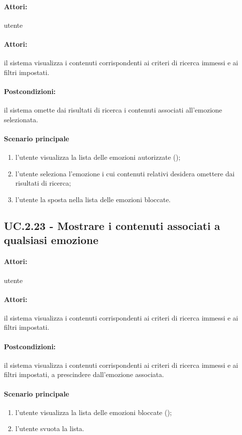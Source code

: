 \documentclass[10pt,a4paper,headinclude,footinclude,hidelinks]{scrreprt} %
\begin{document}
	\paragraph{Attori:} utente
	\paragraph{Attori:} il sistema visualizza i contenuti corrispondenti ai criteri di ricerca immessi e ai filtri impostati.
	\paragraph{Postcondizioni:} il sistema omette dai risultati di ricerca i contenuti associati all'emozione selezionata.
	\paragraph{Scenario principale}
	\begin{enumerate}
	\item l'utente visualizza la lista delle emozioni autorizzate ();
	\item l'utente seleziona l'emozione i cui contenuti relativi desidera omettere dai risultati di ricerca;
	\item l'utente la sposta nella lista delle emozioni bloccate.
	\end{enumerate}

	\subsection[UC.2.23]{UC.2.23 - Mostrare i contenuti associati a qualsiasi emozione}
	\label{sec:stage:ar:uc:2_23}
	\paragraph{Attori:} utente
	\paragraph{Attori:} il sistema visualizza i contenuti corrispondenti ai criteri di ricerca immessi e ai filtri impostati.
	\paragraph{Postcondizioni:} il sistema visualizza i contenuti corrispondenti ai criteri di ricerca immessi e ai filtri impostati, a prescindere dall'emozione associata.
	\paragraph{Scenario principale}
	\begin{enumerate}
	\item l'utente visualizza la lista delle emozioni bloccate ();
	\item l'utente svuota la lista.
	\end{enumerate}
\end{document}
